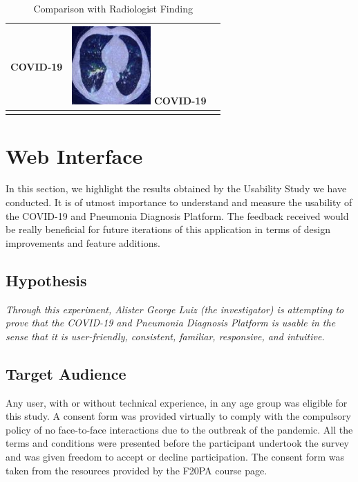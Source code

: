 \begin{longtable} { | c | c | c | }
\begin{minipage}{.3\textwidth}
           \centering  COVID-19
               \vspace{0.5em}
    \end{minipage}
    & 
    \begin{minipage}{.3\textwidth}
        \vspace{1em}
      \includegraphics[width=\linewidth, height=30mm]{Images/ctHeatmap3.jpg}
      \centering COVID-19
          \vspace{0.5em}
    \end{minipage}
      \\ \hline
  \caption{Comparison with Radiologist Finding}\label{tab:radioFindingCT}

\end{longtable}

\section{Web Interface}
In this section, we highlight the results obtained by the Usability Study we have conducted. It is of utmost importance to understand and measure the usability of the COVID-19 and Pneumonia Diagnosis Platform. The feedback received would be really beneficial for future iterations of this application in terms of design improvements and feature additions.

\subsection{Hypothesis} \label{hypo}

\textit{Through this experiment, Alister George Luiz (the investigator) is attempting to prove that the
COVID-19 and Pneumonia Diagnosis Platform is usable in the sense that it is user-friendly, consistent, familiar, responsive, and intuitive.}

\subsection{Target Audience}

Any user, with or without technical experience, in any age group was eligible for this study. A consent form was provided virtually to comply with the compulsory policy of no face-to-face interactions due to the outbreak of the pandemic. All the terms and conditions were presented before the participant undertook the survey and was given freedom to accept or decline participation. The consent form was taken from the resources provided by the F20PA course page.

